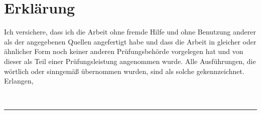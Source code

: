 
\chapter*{Erklärung}
\thispagestyle{empty}
Ich versichere, dass ich die Arbeit ohne fremde Hilfe und ohne Benutzung
anderer als der angegebenen Quellen angefertigt habe und dass die
Arbeit in gleicher oder \"ahnlicher Form noch keiner anderen
Pr\"ufungsbeh\"orde vorgelegen hat und von dieser als Teil einer
Pr\"ufungsleistung angenommen wurde.
Alle Ausf\"uhrungen, die w\"ortlich oder sinngem\"a\ss{}
\"ubernommen wurden, sind als solche gekennzeichnet.
\\[2cm]
Erlangen, 
	{\date{\dateenglish{\today}}}
    	{\date{\datengerman{\today}}}
\\[3cm]
\rule{6cm}{0.5pt}\\
\parbox[l][1cm][c]{6cm}{\hfill \studname \hfill\vbox{}}


